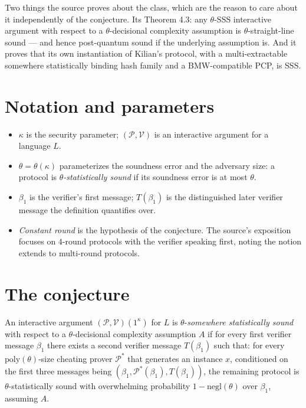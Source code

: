 \documentclass{aicr-conjecture}
\newcommand{\Prover}{\mathcal{P}}
\newcommand{\Verifier}{\mathcal{V}}
\begin{document}
Two things the source proves about the class, which are the reason to
care about it independently of the conjecture. Its Theorem 4.3: any
$\theta$-SSS interactive argument with respect to a $\theta$-decisional
complexity assumption is $\theta$-straight-line sound --- and hence
post-quantum sound if the underlying assumption is. And it proves that
its own instantiation of Kilian's protocol, with a multi-extractable
somewhere statistically binding hash family and a BMW-compatible PCP, is
SSS\@.

\section{Notation and parameters}\label{sec:notation}

\begin{itemize}[nosep]
  \item $\kappa$ is the security parameter; $(\Prover, \Verifier)$ is an
    interactive argument for a language $L$.
  \item $\theta = \theta(\kappa)$ parameterizes the soundness error and
    the adversary size: a protocol is \emph{$\theta$-statistically sound}
    if its soundness error is at most $\theta$.
  \item $\beta_{1}$ is the verifier's first message; $T(\beta_{1})$ is
    the distinguished later verifier message the definition quantifies
    over.
  \item \emph{Constant round} is the hypothesis of the conjecture. The
    source's exposition focuses on $4$-round protocols with the verifier
    speaking first, noting the notion extends to multi-round protocols.
\end{itemize}

\section{The conjecture}\label{sec:conjectures}

\begin{definition}\label{def:sss}
An interactive argument $(\Prover, \Verifier)(1^{\kappa})$ for $L$ is
$\theta$-\emph{somewhere statistically sound} with respect to a
$\theta$-decisional complexity assumption $A$ if for every first verifier
message $\beta_{1}$ there exists a second verifier message $T(\beta_{1})$
such that: for every $\mathrm{poly}(\theta)$-size cheating prover
$\Prover^{\ast}$ that generates an instance $x$, conditioned on the first
three messages being $(\beta_{1}, \Prover^{\ast}(\beta_{1}),
T(\beta_{1}))$, the remaining protocol is $\theta$-statistically sound
with overwhelming probability $1 - \mathrm{negl}(\theta)$ over
$\beta_{1}$, assuming $A$.
\end{definition}
\end{document}

